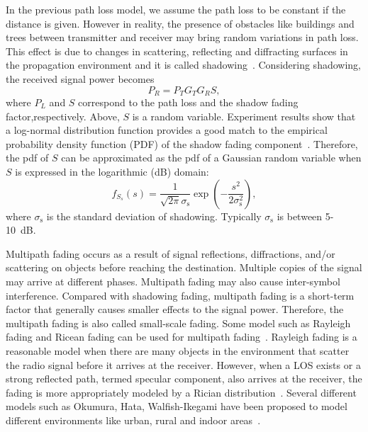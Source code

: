 In the previous path loss model, we assume the path loss to be constant if the distance is given.
However in reality, the presence of obstacles like buildings and trees between transmitter and receiver may bring random variations in path loss.
This effect is due to changes in scattering, reflecting and diffracting surfaces in the propagation environment and it is called shadowing~\cite{rappaport1996wireless}.
Considering shadowing, the received signal power becomes
\begin{equation}
P_{R} = P_{T} G_{T} G_{R} S ,
\end{equation}
where $P_{L}$ and $S$ correspond to the path loss and the shadow fading factor,respectively.
Above, $S$ is a random variable.
Experiment results show that a log-normal distribution function provides a good match to the empirical probability density function (PDF) of the shadow fading component~\cite{bertoni1999radio}.
Therefore, the pdf of $S$ can be approximated as the pdf of a Gaussian random variable when $S$ is expressed in the logarithmic (dB) domain:
\begin{equation} 
f_{S_{s}} (s)
= \frac{1}{\sqrt{2 \pi} \sigma_{\mathrm{s}}} 
\exp \left( - \frac{s^2}{2 \sigma_{\mathrm{s}}^2} \right) ,
\end{equation}
where $\sigma_{\mathrm{s}}$ is the standard deviation of shadowing. Typically $\sigma_{\mathrm{s}}$ is between 5-10~dB.

Multipath fading occurs as a result of signal reflections, diffractions, and/or scattering on objects before reaching the destination.
Multiple copies of the signal may arrive at different phases.
Multipath fading may also cause inter-symbol interference.
Compared with shadowing fading, multipath fading is a short-term factor that generally causes smaller effects to the signal power.
Therefore, the multipath fading is also called small-scale fading.
Some model such as Rayleigh fading and Ricean fading can be used for multipath fading~\cite{rappaport1996wireless}.
Rayleigh fading is a reasonable model when there are many objects in the environment that scatter the radio signal before it arrives at the receiver.
However, when a LOS exists or a strong reflected path, termed specular component, also arrives at the receiver, the fading is more appropriately modeled by a Rician distribution~\cite{stuber2011principles}.
Several different models such as Okumura, Hata, Walfish-Ikegami have been proposed to model different environments like urban, rural and indoor areas~\cite{stuber2011principles}.

